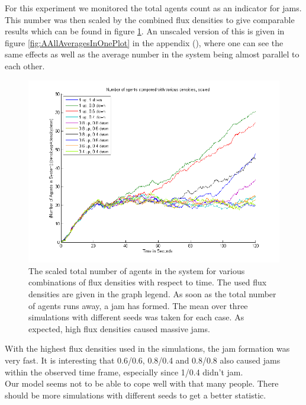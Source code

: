 
\noi For this experiment we monitored the total agents count as an indicator for jams. This number was then scaled by the combined flux densities to give comparable results which can be found in figure \ref{fig:AAllAveragesScaled}. An unscaled version of this is given in figure \ref{fig:AAllAveragesInOnePlot} in the appendix (\pageref{fig:AAllAveragesInOnePlot}), where one can see the same effects as well as the average number in the system being almost parallel to each other.\\
\begin{figure}[h!]
	\centering
		\includegraphics[width=1.00\textwidth]{pictures/AAllAveragesScaled.png}
	\caption{The scaled total number of agents in the system for various combinations of flux densities with respect to time. The used flux densities are given in the graph legend. As soon as the total number of agents runs away, a jam has formed. The mean over three simulations with different seeds was taken for each case. As expected, high flux densities caused massive jams.}
	\label{fig:AAllAveragesScaled}
\end{figure}

\noi With the highest flux densities used in the simulations, the jam formation was very fast. It is interesting that 0.6/0.6, 0.8/0.4 and 0.8/0.8 also caused jams within the observed time frame, especially since 1/0.4 didn't jam.\\
Our model seems not to be able to cope well with that many people. There should be more simulations with different seeds to get a better statistic.\\


